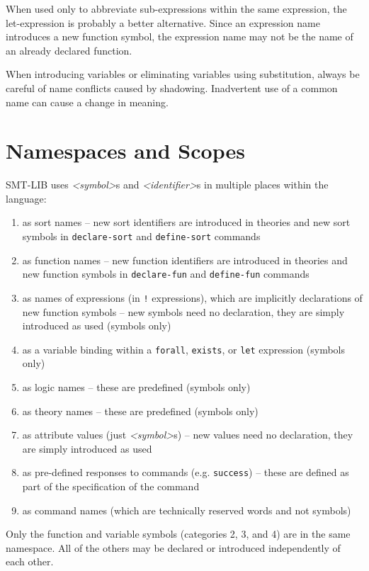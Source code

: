 \documentclass[12pt,oneside]{report}
\newcommand{\sym}{{\it <symbol>}}
\newcommand{\ID}{{\it <identifier>}}
\newcommand{\nospace}{\setlength{\itemsep}{0in}\setlength{\parsep}{0in}\setlength{\parskip}{0in}\setlength{\topsep}{0in}}
\begin{document}
When used only to abbreviate sub-expressions within the same expression, the let-expression is probably a better alternative.  Since an
expression name introduces a new function symbol, the expression name may not be the name of an already declared function.

When introducing variables or eliminating variables using substitution, always be careful of name conflicts caused by shadowing. Inadvertent
use of a common name can cause a change in meaning.



\section{Namespaces and Scopes}

SMT-LIB uses \sym s and \ID s in multiple places within the language:
\begin{enumerate} \nospace
\item as sort names -- new sort identifiers are introduced in theories and new sort symbols in {\tt declare-sort} and {\tt define-sort} commands
\item as function names -- new function identifiers are introduced in theories and new function symbols in {\tt declare-fun} and {\tt define-fun} commands
\item as names of expressions (in {\tt !} expressions), which are implicitly declarations of new function symbols -- new symbols need no declaration, they are simply introduced as used (symbols only)
\item as a variable binding within a {\tt forall}, {\tt exists}, or {\tt let} expression (symbols only)
\item as logic names -- these are predefined (symbols only)
\item as theory names -- these are predefined (symbols only)
\item as attribute values (just \sym s) -- new values need no declaration, they are simply introduced as used
\item as pre-defined responses to commands (e.g. {\tt success}) -- these are defined as part of the specification of the command
\item as command names (which are technically reserved words and not symbols)
\end{enumerate}

Only the function and variable symbols (categories 2, 3, and 4) are in the same namespace.  All of the others may be declared or introduced independently of each other.
\end{document}
